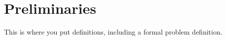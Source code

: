 \section{Preliminaries}
\label{sec:preliminaries}
This is where you put definitions, including a formal problem definition.
